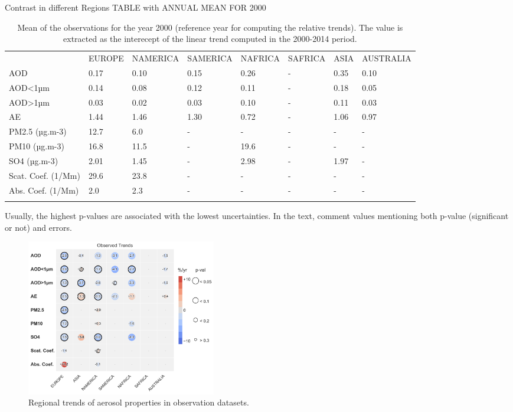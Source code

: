 \documentclass[journal abbreviation, manuscript]{copernicus}
\begin{document}
Contrast in different Regions
TABLE with ANNUAL MEAN FOR 2000

\begin{table}
 \begin{tabular}{llllllll}
  \tophline
                     & EUROPE & NAMERICA & SAMERICA & NAFRICA & SAFRICA & ASIA & AUSTRALIA \\
  \middlehline
  AOD                & 0.17   & 0.10     & 0.15     & 0.26    & -       & 0.35 & 0.10      \\
  AOD<1µm            & 0.14   & 0.08     & 0.12     & 0.11    & -       & 0.18 & 0.05      \\
  AOD>1µm            & 0.03   & 0.02     & 0.03     & 0.10    & -       & 0.11 & 0.03      \\
  AE                 & 1.44   & 1.46     & 1.30     & 0.72    & -       & 1.06 & 0.97      \\
  PM2.5 (µg.m-3)     & 12.7   & 6.0      & -        & -       & -       & -    & -         \\
  PM10 (µg.m-3)      & 16.8   & 11.5     & -        & 19.6    & -       & -    & -         \\
  SO4 (µg.m-3)       & 2.01   & 1.45     & -        & 2.98    & -       & 1.97 & -         \\
  Scat. Coef. (1/Mm) & 29.6   & 23.8     & -        & -       & -       & -    & -         \\
  Abs. Coef. (1/Mm)  & 2.0    & 2.3      & -        & -       & -       & -    & -         \\
  \bottomhline
 \end{tabular}

 \caption{Mean of the observations for the year 2000 (reference year for computing the relative trends). The value is extracted as the interecept of the linear trend computed in the 2000-2014 period.}
 \label{meanobs_2000}
\end{table}


Usually, the highest p-values are associated with the lowest uncertainties.
In the text, comment values mentioning both p-value (significant or not) and errors.

\begin{figure}[t]
 \includegraphics[width=8.3cm]{../scripts/figs/heatmaps/OBS.png}
 \caption{Regional trends of aerosol properties in observation datasets.}
 \label{obs_trends}
\end{figure}
\end{document}
